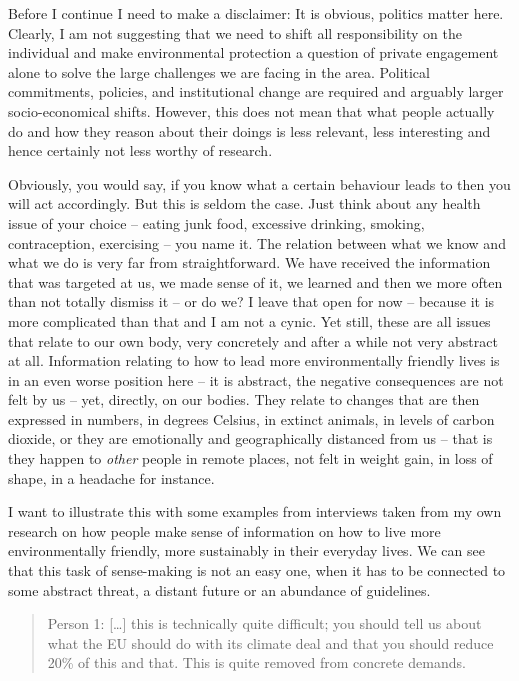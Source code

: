 \documentclass[a4paper,
fontsize=11pt,
oneside,
numbers=noperiodatend,
parskip=half-,
bibliography=totoc,
final
]{scrartcl}
\begin{document}
Before I continue I need to make a disclaimer: It is obvious, politics
matter here. Clearly, I am not suggesting that we need to shift all
responsibility on the individual and make environmental protection a
question of private engagement alone to solve the large challenges we
are facing in the area. Political commitments, policies, and
institutional change are required and arguably larger socio-economical
shifts. However, this does not mean that what people actually do and how
they reason about their doings is less relevant, less interesting and
hence certainly not less worthy of research.

Obviously, you would say, if you know what a certain behaviour leads to
then you will act accordingly. But this is seldom the case. Just think
about any health issue of your choice -- eating junk food, excessive
drinking, smoking, contraception, exercising -- you name it. The
relation between what we know and what we do is very far from
straightforward. We have received the information that was targeted at
us, we made sense of it, we learned and then we more often than not
totally dismiss it -- or do we? I leave that open for now -- because it
is more complicated than that and I am not a cynic. Yet still, these are
all issues that relate to our own body, very concretely and after a
while not very abstract at all. Information relating to how to lead more
environmentally friendly lives is in an even worse position here -- it
is abstract, the negative consequences are not felt by us -- yet,
directly, on our bodies. They relate to changes that are then expressed
in numbers, in degrees Celsius, in extinct animals, in levels of carbon
dioxide, or they are emotionally and geographically distanced from us --
that is they happen to \emph{other} people in remote places, not felt in
weight gain, in loss of shape, in a headache for instance.

I want to illustrate this with some examples from interviews taken from
my own research on how people make sense of information on how to live
more environmentally friendly, more sustainably in their everyday lives.
We can see that this task of sense-making is not an easy one, when it
has to be connected to some abstract threat, a distant future or an
abundance of guidelines.

\begin{quote}
Person 1: {[}\ldots{}{]} this is technically quite difficult; you should
tell us about what the EU should do with its climate deal and that you
should reduce 20\% of this and that. This is quite removed from concrete
demands.
\end{quote}
\end{document}
